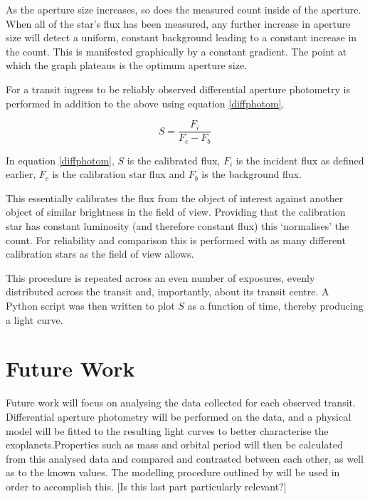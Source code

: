 \documentclass[twoside]{article}
\begin{document}
\begin{multicols}{2}
As the aperture size increases, so does the measured count inside of the aperture. When all of the star's flux has been measured, any further increase in aperture size will detect a uniform, constant background leading to a constant increase in the count. This is manifested graphically by a constant gradient. The point at which the graph plateaus is the optimum aperture size.

For a transit ingress to be reliably observed differential aperture photometry is performed in addition to the above using equation \ref{diffphotom}. 

\begin{equation} \label{diffphotom}
    S = \frac{F_{i}}{F_{c}-F_{b}}
\end{equation}

In equation \ref{diffphotom}, $S$ is the calibrated flux, $F_{i}$ is the incident flux as defined earlier, $F_{c}$ is the calibration star flux and $F_{b}$ is the background flux.

This essentially calibrates the flux from the object of interest against another object of similar brightness in the field of view. Providing that the calibration star has constant luminosity (and therefore constant flux) this `normalises' the count. For reliability and comparison this is performed with as many different calibration stars as the field of view allows.

This procedure is repeated across an even number of exposures, evenly distributed across the transit and, importantly, about its transit centre. A Python script was then written to plot $S$ as a function of time, thereby producing a light curve.


\section{Future Work}
Future work will focus on analysing the data collected for each observed transit. Differential aperture photometry will be performed on the data, and a physical model will be fitted to the resulting light curves to better characterise the exoplanets.Properties such as mass and orbital period will then be calculated from this analysed data and compared and contrasted between each other, as well as to the known values. The modelling procedure outlined by \cite{model} will be used in order to accomplish this. [Is this last part particularly relevant?]


\nocite{*}
\printbibliography

\end{multicols}
\end{document}
